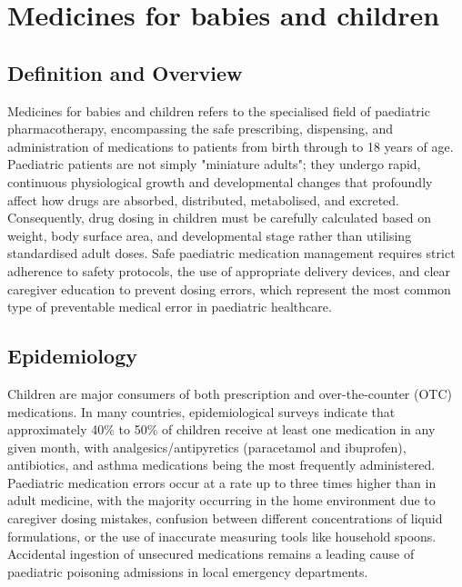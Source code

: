 \chapter{Medicines for babies and children}

\section*{Definition and Overview}
Medicines for babies and children refers to the specialised field of paediatric pharmacotherapy, encompassing the safe prescribing, dispensing, and administration of medications to patients from birth through to 18 years of age. Paediatric patients are not simply "miniature adults"; they undergo rapid, continuous physiological growth and developmental changes that profoundly affect how drugs are absorbed, distributed, metabolised, and excreted. Consequently, drug dosing in children must be carefully calculated based on weight, body surface area, and developmental stage rather than utilising standardised adult doses. Safe paediatric medication management requires strict adherence to safety protocols, the use of appropriate delivery devices, and clear caregiver education to prevent dosing errors, which represent the most common type of preventable medical error in paediatric healthcare.

\section*{Epidemiology}
Children are major consumers of both prescription and over-the-counter (OTC) medications. In many countries, epidemiological surveys indicate that approximately 40\% to 50\% of children receive at least one medication in any given month, with analgesics/antipyretics (paracetamol and ibuprofen), antibiotics, and asthma medications being the most frequently administered. Paediatric medication errors occur at a rate up to three times higher than in adult medicine, with the majority occurring in the home environment due to caregiver dosing mistakes, confusion between different concentrations of liquid formulations, or the use of inaccurate measuring tools like household spoons. Accidental ingestion of unsecured medications remains a leading cause of paediatric poisoning admissions in local emergency departments.

